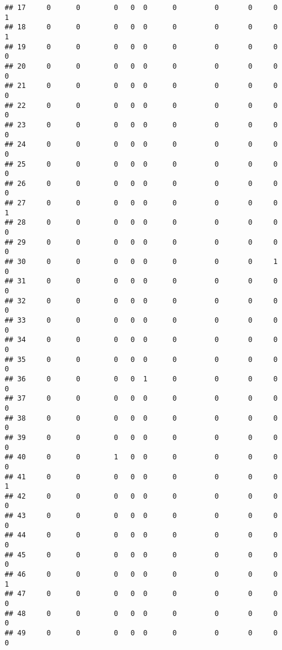 \documentclass[
]{article}
\begin{document}
\begin{verbatim}
## 17     0      0        0   0  0      0         0       0     0            1
## 18     0      0        0   0  0      0         0       0     0            1
## 19     0      0        0   0  0      0         0       0     0            0
## 20     0      0        0   0  0      0         0       0     0            0
## 21     0      0        0   0  0      0         0       0     0            0
## 22     0      0        0   0  0      0         0       0     0            0
## 23     0      0        0   0  0      0         0       0     0            0
## 24     0      0        0   0  0      0         0       0     0            0
## 25     0      0        0   0  0      0         0       0     0            0
## 26     0      0        0   0  0      0         0       0     0            0
## 27     0      0        0   0  0      0         0       0     0            1
## 28     0      0        0   0  0      0         0       0     0            0
## 29     0      0        0   0  0      0         0       0     0            0
## 30     0      0        0   0  0      0         0       0     1            0
## 31     0      0        0   0  0      0         0       0     0            0
## 32     0      0        0   0  0      0         0       0     0            0
## 33     0      0        0   0  0      0         0       0     0            0
## 34     0      0        0   0  0      0         0       0     0            0
## 35     0      0        0   0  0      0         0       0     0            0
## 36     0      0        0   0  1      0         0       0     0            0
## 37     0      0        0   0  0      0         0       0     0            0
## 38     0      0        0   0  0      0         0       0     0            0
## 39     0      0        0   0  0      0         0       0     0            0
## 40     0      0        1   0  0      0         0       0     0            0
## 41     0      0        0   0  0      0         0       0     0            1
## 42     0      0        0   0  0      0         0       0     0            0
## 43     0      0        0   0  0      0         0       0     0            0
## 44     0      0        0   0  0      0         0       0     0            0
## 45     0      0        0   0  0      0         0       0     0            0
## 46     0      0        0   0  0      0         0       0     0            1
## 47     0      0        0   0  0      0         0       0     0            0
## 48     0      0        0   0  0      0         0       0     0            0
## 49     0      0        0   0  0      0         0       0     0            0

\end{verbatim}
\end{document}
